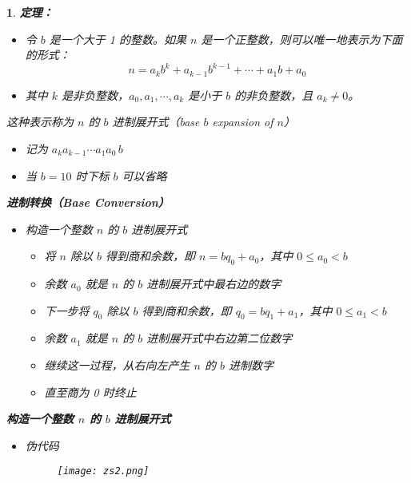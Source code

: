\documentclass[UTF8]{report}
\theoremstyle{MyLineTheoremStyle} %
\theoremstyle{MyBlockTheoremStyle} %
\theoremstyle{MySubsubsectionStyle} %
\newtheorem{definition}{}
\begin{document}
\begin{definition}
    \textbf{定理：}
    \begin{itemize}
        \item 令 $b$ 是一个大于 1 的整数。如果 $n$ 是一个正整数，则可以唯一地表示为下面的形式：
        \[
        n = a_k b^k + a_{k-1} b^{k-1} + \cdots + a_1 b + a_0
        \]
        \item 其中 $k$ 是非负整数，$a_0, a_1, \cdots, a_k$ 是小于 $b$ 的非负整数，且 $a_k \neq 0$。
    \end{itemize}

    \item 这种表示称为 $n$ 的 $b$ 进制展开式（base $b$ expansion of $n$）
    \begin{itemize}
        \item 记为 $a_k a_{k-1} \cdots a_1 a_0 \, b$
        \item 当 $b = 10$ 时下标 $b$ 可以省略
    \end{itemize}

    \textbf{进制转换（Base Conversion）}
    \begin{itemize}
        \item 构造一个整数 $n$ 的 $b$ 进制展开式
        \begin{itemize}
            \item 将 $n$ 除以 $b$ 得到商和余数，即 $n = bq_0 + a_0$，其中 $0 \leq a_0 < b$
            \item 余数 $a_0$ 就是 $n$ 的 $b$ 进制展开式中最右边的数字
            \item 下一步将 $q_0$ 除以 $b$ 得到商和余数，即 $q_0 = bq_1 + a_1$，其中 $0 \leq a_1 < b$
            \item 余数 $a_1$ 就是 $n$ 的 $b$ 进制展开式中右边第二位数字
            \item 继续这一过程，从右向左产生 $n$ 的 $b$ 进制数字
            \item 直至商为 0 时终止
        \end{itemize}
    \end{itemize}

    \textbf{构造一个整数 $n$ 的 $b$ 进制展开式}
    \begin{itemize}
        \item 伪代码
        \begin{figure}[ht]
            \centering
            \texttt{[image: zs2.png]}
        \end{figure}
    \end{itemize}


\end{definition}
\end{document}
